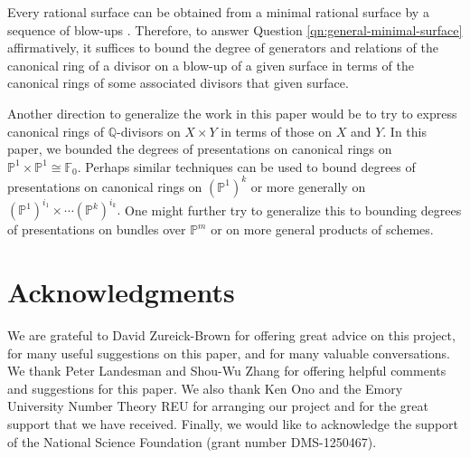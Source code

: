 \documentclass{amsart}
\theoremstyle{plain}
\theoremstyle{definition}
\theoremstyle{remark}
\numberwithin{equation}{section}
\newcommand\bq{{\mathbb Q}}
\newcommand\bp{{\mathbb P}}
\newcommand\hirz{\mathbb{F}}
\begin{document}
Every rational surface can be obtained from a minimal rational surface by a 
sequence of blow-ups \cite{eisenbud-harris:minimal}. Therefore, to answer
Question \ref{qn:general-minimal-surface} affirmatively, it suffices
to bound the degree of generators and relations of the 
canonical ring of a divisor on a blow-up of a given surface
in terms of the canonical
rings of some associated divisors that given surface.

Another direction to generalize the work in this paper
would be to try to express canonical rings of $\bq$-divisors on
$X \times Y$ in terms of those on $X$ and $Y$. In this paper,
we bounded the degrees of presentations on canonical rings on $\bp^1 \times \bp^1 \cong \hirz_0$.
Perhaps similar techniques can be used to bound
degrees of presentations on canonical rings on $(\bp^1)^k$ or
more generally on $(\bp^1)^{i_1} \times \cdots (\bp^k)^{i_k}.$
One might further try to generalize this to bounding degrees of presentations on bundles over $\bp^m$ or on more general
products of schemes.


\section{Acknowledgments}
\label{sec:ack}
We are grateful to David Zureick-Brown for offering great advice on
this project, for many useful suggestions on this paper, and for
many valuable conversations. We thank Peter
Landesman and Shou-Wu Zhang for offering helpful comments and
suggestions for this paper. We also thank Ken Ono and the
Emory University Number Theory REU for arranging our project and
for the great support that we have received. Finally, we would like to acknowledge the
support of the National Science Foundation (grant number DMS-1250467).


\nocite{*}
{}

\end{document}
